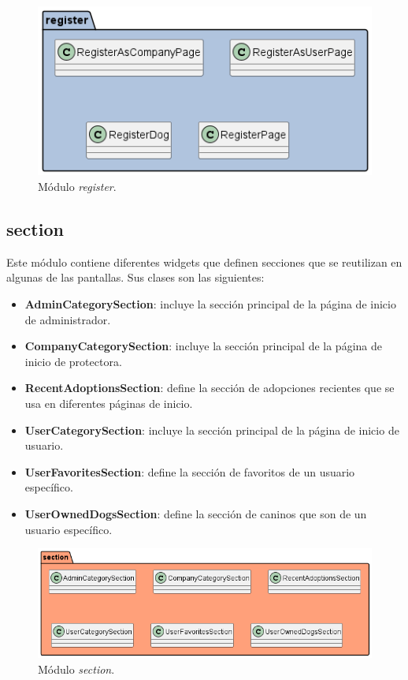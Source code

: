 \documentclass[a4paper, 12pt]{article}
\begin{document}
\begin{figure}[H]
	\begin{center}
		{\includegraphics[width=0.8\linewidth]{diagram/Register.png}\par}
		\caption{Módulo  \textit{register}.}
	\end{center}
\end{figure}

\subsection*{section}

Este módulo contiene diferentes widgets que definen secciones que se reutilizan en algunas de las pantallas. Sus clases son las siguientes:

\begin{itemize}[noitemsep]
	\item \textbf{AdminCategorySection}: incluye la sección principal de la página de inicio de administrador.
	\item \textbf{CompanyCategorySection}: incluye la sección principal de la página de inicio de protectora.
	\item \textbf{RecentAdoptionsSection}:  define la sección de adopciones recientes que se usa en diferentes páginas de inicio.
	\item \textbf{UserCategorySection}:  incluye la sección principal de la página de inicio de usuario.
	\item \textbf{UserFavoritesSection}:  define la sección de favoritos de un usuario específico.
	\item \textbf{UserOwnedDogsSection}:  define la sección de caninos que son de un usuario específico.
\end{itemize}


\begin{figure}[H]
	\begin{center}
		{\includegraphics[width=0.8\linewidth]{diagram/Section.png}\par}
		\caption{Módulo  \textit{section}.}
	\end{center}
\end{figure}
\end{document}
